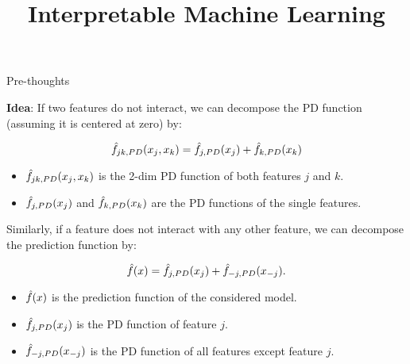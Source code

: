 \documentclass[11pt,compress,t,notes=noshow, aspectratio=169, xcolor=table]{beamer}
\title{Interpretable Machine Learning}
\date{}
\begin{document}
\newcommand{\titlefigure}{figure/h-statistic}
\newcommand{\learninggoals}{
\item Understand the Friedman's H-statistic
\item How to measure the overall interaction strength
\item How to measure 2-way interaction strengths
}


\begin{vbframe}{Pre-thoughts}
	
		\textbf{Idea}: If two features do not interact, we can decompose the PD function (assuming it is centered at zero) by:
	

	$$\hat{f}_{jk, PD}(x_j, x_k) = \hat{f}_{j, PD}(x_j) + \hat{f}_{k, PD}(x_k)$$

\begin{itemize}
	\item $\hat{f}_{jk, PD}(x_j, x_k)$ is the 2-dim PD function of both features $j$ and $k$.
	\item $\hat{f}_{j, PD}(x_j)$ and $\hat{f}_{k, PD}(x_k)$ are the PD functions of the single features.
\end{itemize}

	Similarly, if a feature does not interact with any other feature, we can decompose the prediction function by:

	$$\hat{f}(x) = \hat{f}_{j, PD}(x_j) +  \hat{f}_{-j, PD}(x_{-j}).$$

\begin{itemize}
	\item $\hat{f}(x)$ is the prediction function of the considered model.
	\item $\hat{f}_{j, PD}(x_j)$ is the PD function of feature $j$.
	\item $\hat{f}_{-j, PD}(x_{-j})$ is the PD function of all features except feature $j$.
\end{itemize}
\end{vbframe}
\end{document}
